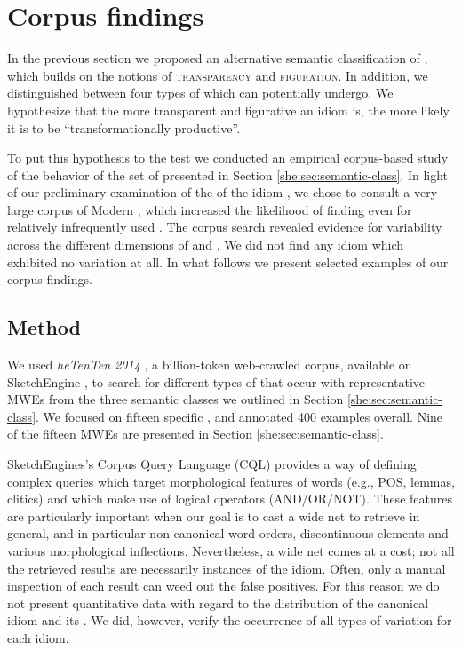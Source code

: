 \documentclass[output=paper]{langsci/langscibook}
\begin{document}
\section{Corpus findings}
In the previous section we proposed an alternative semantic classification of , which builds on the notions of {\scshape transparency} and {\scshape figuration}. In addition, we distinguished between four types of  which  can potentially undergo.
We hypothesize that the more transparent and figurative an idiom is, the more likely it is to be ``transformationally productive''.

To put this hypothesis to the test we conducted an empirical corpus-based study of the behavior of the set of  presented in Section \ref{she:sec:semantic-class}. In light of our preliminary examination of the  of the idiom , we chose to consult a very large corpus of Modern , which increased the likelihood of finding  even for relatively infrequently used . The corpus search revealed evidence for variability across the different dimensions of  and . We did not find any idiom which exhibited no variation at all. In what follows we present selected examples of our corpus findings.

\label{she:sec:findings}
\subsection{Method}
\label{she:sec:method}
We used \emph{heTenTen 2014} \citep{baroni-bernardini-ferraresi-zanchetta-2009}, a billion-token web-crawled  corpus, available on SketchEngine \citep{sketchengine}, to search for different types of  that occur with representative MWEs from the three semantic classes we outlined in Section \ref{she:sec:semantic-class}. We focused on fifteen specific , and annotated 400 examples overall. Nine of the fifteen MWEs are presented in Section \ref{she:sec:semantic-class}.

SketchEngines's Corpus Query Language (CQL) provides a way of defining complex queries which target morphological features of words (e.g., POS, lemmas, clitics) and which make
use of logical operators (AND/OR/NOT). These features are particularly important when our goal is to cast a wide net to retrieve  in general, and in particular non-canonical word orders, discontinuous elements and various morphological inflections. Nevertheless, a wide net comes at a cost; not all the retrieved results are necessarily instances of the idiom. Often, only a manual inspection of each result can weed out the false positives. For this reason we do not present quantitative data with regard to the distribution of the canonical idiom and its . We did, however, verify the occurrence of all types of variation for each idiom.
\end{document}

